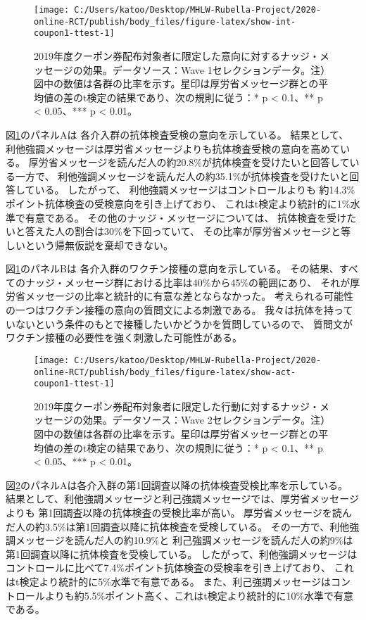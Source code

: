 \documentclass[
  11pt,
  a4paper,
]{article}
\begin{document}
\begin{figure}[t]
\texttt{[image: C:/Users/katoo/Desktop/MHLW-Rubella-Project/2020-online-RCT/publish/body\_files/figure-latex/show-int-coupon1-ttest-1]} \caption{2019年度クーポン券配布対象者に限定した意向に対するナッジ・メッセージの効果。データソース：Wave 1セレクションデータ。注）図中の数値は各群の比率を示す。星印は厚労省メッセージ群との平均値の差のt検定の結果であり、次の規則に従う：* p < 0.1、** p < 0.05、*** p < 0.01。}\label{fig:show-int-coupon1-ttest}
\end{figure}

図\ref{fig:show-int-coupon1-ttest}のパネルAは
各介入群の抗体検査受検の意向を示している。
結果として、
利他強調メッセージは厚労省メッセージよりも抗体検査受検の意向を高めている。
厚労省メッセージを読んだ人の約20.8\%が抗体検査を受けたいと回答している一方で、
利他強調メッセージを読んだ人の約35.1\%が抗体検査を受けたいと回答している。
したがって、
利他強調メッセージはコントロールよりも
約14.3\%ポイント抗体検査の受検意向を引き上げており、
これはt検定より統計的に1\%水準で有意である。
その他のナッジ・メッセージについては、
抗体検査を受けたいと答えた人の割合は30\%を下回っていて、
その比率が厚労省メッセージと等しいという帰無仮説を棄却できない。

図\ref{fig:show-int-coupon1-ttest}のパネルBは
各介入群のワクチン接種の意向を示している。
その結果、すべてのナッジ・メッセージ群における比率は40\%から45\%の範囲にあり、
それが厚労省メッセージの比率と統計的に有意な差とならなかった。
考えられる可能性の一つはワクチン接種の意向の質問文による刺激である。
我々は抗体を持っていないという条件のもとで接種したいかどうかを質問しているので、
質問文がワクチン接種の必要性を強く刺激した可能性がある。

\begin{figure}[t]
\texttt{[image: C:/Users/katoo/Desktop/MHLW-Rubella-Project/2020-online-RCT/publish/body\_files/figure-latex/show-act-coupon1-ttest-1]} \caption{2019年度クーポン券配布対象者に限定した行動に対するナッジ・メッセージの効果。データソース：Wave 2セレクションデータ。注）図中の数値は各群の比率を示す。星印は厚労省メッセージ群との平均値の差のt検定の結果であり、次の規則に従う：* p < 0.1、** p < 0.05、*** p < 0.01。}\label{fig:show-act-coupon1-ttest}
\end{figure}

図\ref{fig:show-act-coupon1-ttest}のパネルAは各介入群の第1回調査以降の抗体検査受検比率を示している。
結果として、利他強調メッセージと利己強調メッセージでは、厚労省メッセージよりも
第1回調査以降の抗体検査の受検比率が高い。
厚労省メッセージを読んだ人の約3.5\%は第1回調査以降に抗体検査を受検している。
その一方で、利他強調メッセージを読んだ人の約10.9\%と
利己強調メッセージを読んだ人の約9\%は第1回調査以降に抗体検査を受検している。
したがって、利他強調メッセージはコントロールに比べて7.4\%ポイント抗体検査の受検率を引き上げており、
これはt検定より統計的に5\%水準で有意である。
また、利己強調メッセージはコントロールよりも約5.5\%ポイント高く、これはt検定より統計的に10\%水準で有意である。
\end{document}
